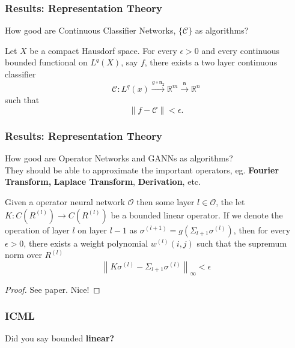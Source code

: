 \documentclass{beamer}
\begin{document}
\begin{frame}
	\frametitle{Results: Representation Theory}

	How good are Continuous Classifier Networks, $\{\mathcal{C}\}$ as algorithms? \\

	\begin{theorem}
		Let $X$ be a compact Hausdorf space. For every $\epsilon >0$ and every continuous bounded functional on $L^q(X)$, say $f$, there exists
		a two layer continuous classifier
		\begin{equation}
			\mathcal{C}: L^q(x) \xrightarrow{g \circ \mathfrak{n}_2} \mathbb{R}^m \xrightarrow{\mathfrak{n}} \mathbb{R}^n
		\end{equation}
		such that
		\begin{equation}
			\|f - \mathcal{C}\| < \epsilon.
		\end{equation}
	\end{theorem}

\end{frame}

\begin{frame}
	\frametitle{Results: Representation Theory}

	How good are Operator Networks and GANNs as algorithms? \\

	They should be able to approximate the important operators, eg. \textbf{Fourier Transform,} \textbf{Laplace Transform}, \textbf{Derivation}, etc.

\begin{theorem}
Given a operator neural network $\mathcal{O}$ then some layer $l \in \mathcal{O}$, the let $K:C(R^{(l)})\to C(R^{(l)})$ be a bounded linear operator. If we denote the operation of layer $l$ on layer $l-1$ as $\sigma^{(l+1)} = g\left(\Sigma_{l+1}\sigma^{(l)}\right)$, then for every $\epsilon >0$, there exists a weight polynomial $w^{(l)}(i,j)$ such that the supremum norm over $R^{(l)}$ \begin{equation}\left\|K\sigma^{(l)} -\Sigma_{l+1}\sigma^{(l)}\right\|_{\infty} < \epsilon\end{equation}

\end{theorem}
\begin{proof}
	See paper. Nice!
\end{proof}
\end{frame}

\begin{frame}
\frametitle{ICML}

\Huge{\centerline{Did you say bounded \textbf{linear?} }}	
\end{frame}
\end{document}
